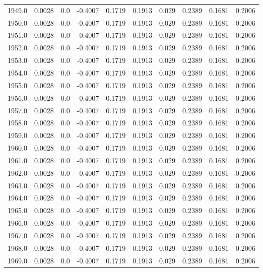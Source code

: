 \begin{longtable}{lrrrrrrrrr}
1949.0 & 0.0028 & 0.0 & -0.4007 & 0.1719 & 0.1913 & 0.029 & 0.2389 & 0.1681 & 0.2006 \\
1950.0 & 0.0028 & 0.0 & -0.4007 & 0.1719 & 0.1913 & 0.029 & 0.2389 & 0.1681 & 0.2006 \\
1951.0 & 0.0028 & 0.0 & -0.4007 & 0.1719 & 0.1913 & 0.029 & 0.2389 & 0.1681 & 0.2006 \\
1952.0 & 0.0028 & 0.0 & -0.4007 & 0.1719 & 0.1913 & 0.029 & 0.2389 & 0.1681 & 0.2006 \\
1953.0 & 0.0028 & 0.0 & -0.4007 & 0.1719 & 0.1913 & 0.029 & 0.2389 & 0.1681 & 0.2006 \\
1954.0 & 0.0028 & 0.0 & -0.4007 & 0.1719 & 0.1913 & 0.029 & 0.2389 & 0.1681 & 0.2006 \\
1955.0 & 0.0028 & 0.0 & -0.4007 & 0.1719 & 0.1913 & 0.029 & 0.2389 & 0.1681 & 0.2006 \\
1956.0 & 0.0028 & 0.0 & -0.4007 & 0.1719 & 0.1913 & 0.029 & 0.2389 & 0.1681 & 0.2006 \\
1957.0 & 0.0028 & 0.0 & -0.4007 & 0.1719 & 0.1913 & 0.029 & 0.2389 & 0.1681 & 0.2006 \\
1958.0 & 0.0028 & 0.0 & -0.4007 & 0.1719 & 0.1913 & 0.029 & 0.2389 & 0.1681 & 0.2006 \\
1959.0 & 0.0028 & 0.0 & -0.4007 & 0.1719 & 0.1913 & 0.029 & 0.2389 & 0.1681 & 0.2006 \\
1960.0 & 0.0028 & 0.0 & -0.4007 & 0.1719 & 0.1913 & 0.029 & 0.2389 & 0.1681 & 0.2006 \\
1961.0 & 0.0028 & 0.0 & -0.4007 & 0.1719 & 0.1913 & 0.029 & 0.2389 & 0.1681 & 0.2006 \\
1962.0 & 0.0028 & 0.0 & -0.4007 & 0.1719 & 0.1913 & 0.029 & 0.2389 & 0.1681 & 0.2006 \\
1963.0 & 0.0028 & 0.0 & -0.4007 & 0.1719 & 0.1913 & 0.029 & 0.2389 & 0.1681 & 0.2006 \\
1964.0 & 0.0028 & 0.0 & -0.4007 & 0.1719 & 0.1913 & 0.029 & 0.2389 & 0.1681 & 0.2006 \\
1965.0 & 0.0028 & 0.0 & -0.4007 & 0.1719 & 0.1913 & 0.029 & 0.2389 & 0.1681 & 0.2006 \\
1966.0 & 0.0028 & 0.0 & -0.4007 & 0.1719 & 0.1913 & 0.029 & 0.2389 & 0.1681 & 0.2006 \\
1967.0 & 0.0028 & 0.0 & -0.4007 & 0.1719 & 0.1913 & 0.029 & 0.2389 & 0.1681 & 0.2006 \\
1968.0 & 0.0028 & 0.0 & -0.4007 & 0.1719 & 0.1913 & 0.029 & 0.2389 & 0.1681 & 0.2006 \\
1969.0 & 0.0028 & 0.0 & -0.4007 & 0.1719 & 0.1913 & 0.029 & 0.2389 & 0.1681 & 0.2006 \\

\end{longtable}

